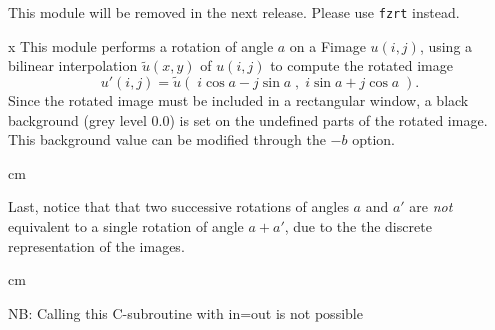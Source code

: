 This module will be removed in the next release. Please use 
\verb+fzrt+ instead.

\vskip 2cm
x
This module performs a rotation of angle $a$ on a Fimage $u(i,j)$, using
a bilinear interpolation $\tilde{u}(x,y)$ of $u(i,j)$ to compute the rotated 
image
$$u'(i,j) = \tilde{u}(\;i \cos a - j \sin a\;,\;i \sin a + j \cos a\;).$$
Since the rotated image must be included in a rectangular window, a 
black background (grey level $0.0$) is set on the undefined parts of
the rotated image. This background value can be modified through the 
$-b$ option.

 cm

Last, notice that that two successive rotations of angles $a$ and $a'$ 
are {\em not} equivalent to a single rotation of angle $a+a'$, due to
the the discrete representation of the images.

 cm

NB: Calling this C-subroutine with in=out is not possible
